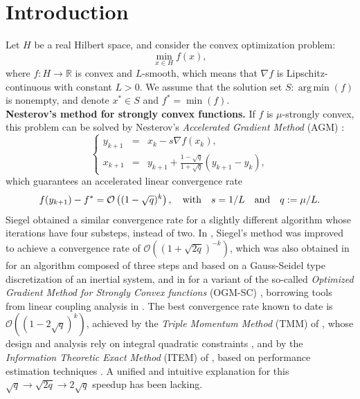\documentclass[pdflatex,sn-mathphys-num]{sn-jnl}
\theoremstyle{thmstyleone}
\theoremstyle{thmstyletwo}
\theoremstyle{thmstylethree}
\DeclareMathOperator*{\argmin}{arg\,min}
\newcommand{\qbox}[1]{\quad\hbox{#1}\quad}
\newcommand{\R}{\mathbb{R}}
\begin{document}
\section{Introduction}
Let $H$ be a real Hilbert space, and consider the convex optimization problem:
\begin{equation*}
\min_{x\in H} f(x),
\end{equation*}
where $f:H\to\R$ is convex and $L$-smooth, which means that $\nabla f$ is Lipschitz-continuous with constant $L>0$. We assume that the solution set $S:\argmin(f)$ is nonempty, and denote $x^*\in S$ and $f^*=\min(f)$. \\

{\bf Nesterov's method for strongly convex functions.} If $f$ is $\mu$-strongly convex, this problem can be solved by Nesterov's {\it Accelerated Gradient Method} (AGM) \cite{Nesterov_2004}:
\begin{equation}\label{E: NAG-SC}
\left\{
\begin{array}{rcl}
y_{k+1} &=& x_k - s\nabla f(x_k),\\[3pt]
x_{k+1} &=& y_{k+1} + \frac{1-\sqrt{q}}{1+\sqrt{q}}(y_{k+1}-y_k),
\end{array}
\right.
\end{equation}
which guarantees an accelerated linear convergence rate \cite{Nesterov_2004,Bansal_2019,Luo_2022}  
$$ f(y_{k+1}) - f^* = \mathcal{O}\left( (1-\sqrt{q})^k \right),\qbox{with} s=1/L \qbox{and} q:=\mu/L.  $$
Siegel \cite{Siegel_2019} obtained a similar convergence rate for a slightly different algorithm whose iterations have four substeps, instead of two. In \cite{Aujol_2022}, Siegel's method was improved to achieve a convergence rate of $\mathcal{O}\left( (1+\sqrt{2q})^{-k}\right)$, which was also obtained in \cite{Luo_2021} for an algorithm composed of three steps and based on a Gauss-Seidel type discretization of an inertial system, and in \cite{Park_2023} for a variant of the so-called {\it Optimized Gradient Method for Strongly Convex functions} (OGM-SC) \cite{Drori_2014,Kim_2016,Kim_2017}, borrowing tools from linear coupling analysis in \cite{Zhu_2017}. The best convergence rate known to date is $\mathcal{O}\left( (1-2\sqrt{q})^{k} \right)$, achieved by the {\it Triple Momentum Method} (TMM) of \cite{Scoy_2018}, whose design and analysis rely on integral quadratic constraints \cite{Lessard_2016}, and by the {\it Information Theoretic Exact Method} (ITEM) of \cite{Taylor_2023_optimal}, based on performance estimation techniques \cite{Drori_2014}. A unified and intuitive explanation for this $\sqrt{q}\to\sqrt{2q}\to 2\sqrt{q}$ speedup has been lacking. \\
\end{document}

